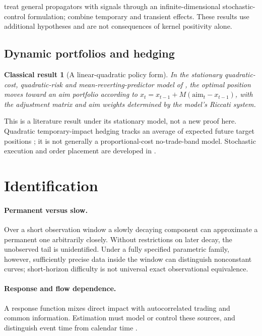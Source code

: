\documentclass[11pt]{article}
\numberwithin{equation}{section}
\newtheorem{classical}[theorem]{Classical result}
\theoremstyle{definition}
\theoremstyle{remark}
\theoremstyle{definition}
\begin{document}
\citet{abijaberneuman2022} treat general propagators with signals through an
infinite-dimensional stochastic-control formulation; \citet{neumannvoss2022}
combine temporary and transient effects. These results use additional
hypotheses and are not consequences of kernel positivity alone.

\subsection{Dynamic portfolios and hedging}
\begin{classical}[A linear-quadratic policy form]\label{prop:gp}
In the stationary quadratic-cost, quadratic-risk and mean-reverting-predictor
model of \citet{garleanupedersen2013}, the optimal position moves toward an aim
portfolio according to
$ x_t=x_{t-1}+M(\mathrm{aim}_t-x_{t-1})$,
with the adjustment matrix and aim weights determined by the model's Riccati
system.
\end{classical}
This is a literature result under its stationary model, not a new proof here.
Quadratic temporary-impact hedging tracks an average of expected future target
positions \citep{banksoner2017}; it is not generally a proportional-cost
no-trade-band model. Stochastic execution and order placement are developed in
\citet{carteajaimungal2015,gueant2016,gatheralschied2011,lehallemounjid2017}.

\section{Identification}\label{sec:ident}
\paragraph{Permanent versus slow.}
Over a short observation window a slowly decaying component can approximate a
permanent one arbitrarily closely. Without restrictions on later decay, the
unobserved tail is unidentified. Under a fully specified parametric family,
however, sufficiently precise data inside the window can distinguish nonconstant
curves; short-horizon difficulty is not universal exact observational equivalence.

\paragraph{Response and flow dependence.}
A response function mixes direct impact with autocorrelated trading and common
information. Estimation must model or control these sources, and distinguish
event time from calendar time \citep{bouchaud2004,bouchaud2018}.
\end{document}
